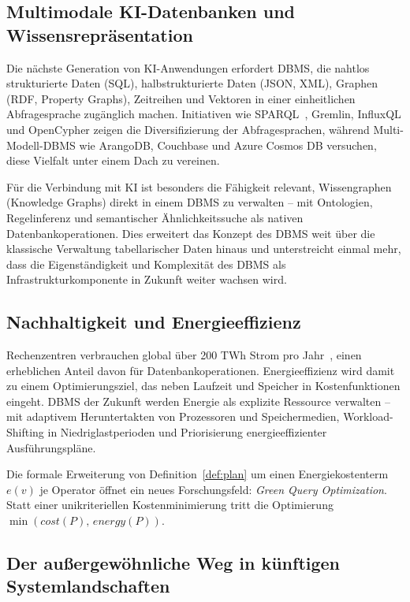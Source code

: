 ﻿\documentclass[a4paper,12pt]{article}
\theoremstyle{definition}
\begin{document}
\subsection{Multimodale KI-Datenbanken und Wissensrepräsentation}

Die nächste Generation von KI-Anwendungen erfordert DBMS, die nahtlos strukturierte Daten (SQL), halbstrukturierte Daten (JSON, XML), Graphen (RDF, Property Graphs), Zeitreihen und Vektoren in einer einheitlichen Abfragesprache zugänglich machen. Initiativen wie SPARQL~\cite{sparql2013}, Gremlin, InfluxQL und OpenCypher zeigen die Diversifizierung der Abfragesprachen, während Multi-Modell-DBMS wie ArangoDB, Couchbase und Azure Cosmos DB versuchen, diese Vielfalt unter einem Dach zu vereinen.

Für die Verbindung mit KI ist besonders die Fähigkeit relevant, Wissengraphen (Knowledge Graphs) direkt in einem DBMS zu verwalten -- mit Ontologien, Regelinferenz und semantischer Ähnlichkeitssuche als nativen Datenbankoperationen. Dies erweitert das Konzept des DBMS weit über die klassische Verwaltung tabellarischer Daten hinaus und unterstreicht einmal mehr, dass die Eigenständigkeit und Komplexität des DBMS als Infrastrukturkomponente in Zukunft weiter wachsen wird.

\subsection{Nachhaltigkeit und Energieeffizienz}

Rechenzentren verbrauchen global über 200 TWh Strom pro Jahr~\cite{iea2023datacenter}, einen erheblichen Anteil davon für Datenbankoperationen. Energieeffizienz wird damit zu einem Optimierungsziel, das neben Laufzeit und Speicher in Kostenfunktionen eingeht. DBMS der Zukunft werden Energie als explizite Ressource verwalten -- mit adaptivem Heruntertakten von Prozessoren und Speichermedien, Workload-Shifting in Niedriglastperioden und Priorisierung energieeffizienter Ausführungspläne.

Die formale Erweiterung von Definition~\ref{def:plan} um einen Energiekostenterm $e(v)$ je Operator öffnet ein neues Forschungsfeld: \emph{Green Query Optimization}. Statt einer unikriteriellen Kostenminimierung tritt die Optimierung \mbox{$\min(\mathit{cost}(P),\, \mathit{energy}(P))$}.

\subsection{Der außergewöhnliche Weg in künftigen Systemlandschaften}
\end{document}
